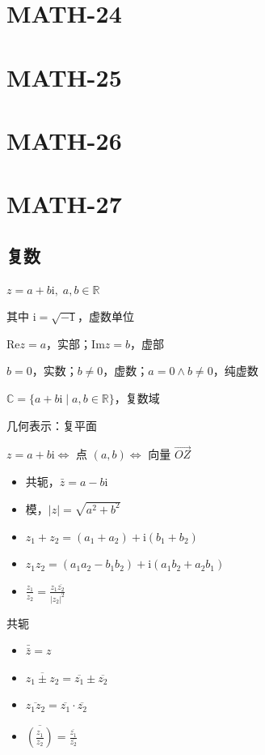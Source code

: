 \section{MATH-24}\label{math-24}

\section{MATH-25}\label{math-25}

\section{MATH-26}\label{math-26}

\section{MATH-27}\label{math-27}

\subsection{复数}\label{ux590dux6570}

\(z=a+b \mathrm{i}, \; a, b \in \mathbb{R}\)

其中 \(\mathrm{i}=\sqrt{ -1 }\)，虚数单位

\(\mathrm{Re}z=a\)，实部；\(\mathrm{Im}z=b\)，虚部

\(b=0\)，实数；\(b\neq 0\)，虚数；\(a=0 \wedge b\neq 0\)，纯虚数

\(\mathbb{C}=\{ a+b\mathrm{i} \mid a, b \in \mathbb{R} \}\)，复数域

几何表示：复平面

\(z=a+b\mathrm{i} \iff\) 点 \((a,b) \iff\) 向量 \(\overrightarrow{OZ}\)

\begin{itemize}
\tightlist
\item
  共轭，\(\bar{z}=a-b\mathrm{i}\)
\item
  模，\(|z|=\sqrt{ a^{2}+b^{2} }\)
\item
  \(z_{1}+z_{2}=(a_{1}+a_{2})+\mathrm{i}(b_{1}+b_{2})\)
\item
  \(z_{1}z_{2}=(a_{1}a_{2}-b_{1}b_{2})+\mathrm{i}(a_{1}b_{2}+a_{2}b_{1})\)
\item
  \(\frac{z_{1}}{z_{2}}= \frac{z_{1}\overline{z_{2}}}{|z_{2}|^{2}}\)
\end{itemize}

共轭

\begin{itemize}
\tightlist
\item
  \(\bar{\bar{z}}=z\)
\item
  \(\overline{z_{1}\pm z_{2}}=\overline{z_{1}}\pm\overline{z_{2}}\)
\item
  \(\overline{z_{1}z_{2}}=\overline{z_{1}}\cdot\overline{z_{2}}\)
\item
  \(\overline{\left( \frac{z_{1}}{z_{2}} \right)}=\frac{\overline{z_{1}}}{\overline{z_{2}}}\)
\end{itemize}

